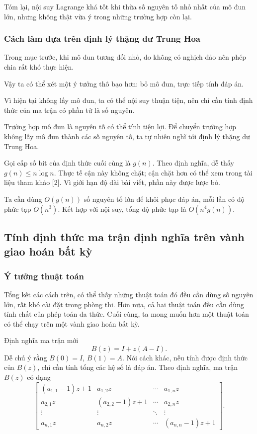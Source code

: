 \documentclass[11pt]{article}
\begin{document}
Tóm lại, nội suy Lagrange khá tốt khi thừa số nguyên tố nhỏ nhất của mô đun lớn,
nhưng không thật vừa ý trong những trường hợp còn lại.

\subsubsection{Cách làm dựa trên định lý thặng dư Trung Hoa}

Trong mục trước, khi mô đun tương đối nhỏ, do không có nghịch đảo nên phép chia
rất khó thực hiện.

Vậy ta có thể xét một ý tưởng thô bạo hơn: bỏ mô đun, trực tiếp tính đáp án.

Vì hiện tại không lấy mô đun, ta có thể nội suy thuận tiện, nên chỉ cần tính
định thức của ma trận có phần tử là số nguyên.

Trường hợp mô đun là nguyên tố có thể tính tiện lợi. Để chuyển trường hợp không
lấy mô đun thành các số nguyên tố, ta tự nhiên nghĩ tới định lý thặng dư Trung
Hoa.

Gọi cấp số bit của định thức cuối cùng là \(g(n)\). Theo định nghĩa, dễ thấy
\(g(n)\le n\log n\). Thực tế cận này không chặt; cận chặt hơn có thể xem trong
tài liệu tham khảo [2]. Vì giới hạn độ dài bài viết, phần này được lược bỏ.

Ta cần dùng \(O(g(n))\) số nguyên tố lớn để khôi phục đáp án, mỗi lần có độ phức
tạp \(O(n^3)\). Kết hợp với nội suy, tổng độ phức tạp là \(O(n^4g(n))\).

\subsection{Tính định thức ma trận định nghĩa trên vành giao hoán bất kỳ}

\subsubsection{Ý tưởng thuật toán}

Tổng kết các cách trên, có thể thấy những thuật toán đó đều cần dùng số nguyên
lớn, rất khó cài đặt trong phòng thi. Hơn nữa, cả hai thuật toán đều cần dùng
tính chất của phép toán đa thức. Cuối cùng, ta mong muốn hơn một thuật toán có
thể chạy trên một vành giao hoán bất kỳ.

Định nghĩa ma trận mới
\[
  B(z)=I+z(A-I).
\]
Dễ chú ý rằng \(B(0)=I\), \(B(1)=A\). Nói cách khác, nếu tính được định thức của
\(B(z)\), chỉ cần tính tổng các hệ số là đáp án. Theo định nghĩa, ma trận
\(B(z)\) có dạng
\[
  \begin{bmatrix}
  (a_{1,1}-1)z+1 & a_{1,2}z & \cdots & a_{1,n}z\\
  a_{2,1}z & (a_{2,2}-1)z+1 & \cdots & a_{2,n}z\\
  \vdots & \vdots & \ddots & \vdots\\
  a_{n,1}z & a_{n,2}z & \cdots & (a_{n,n}-1)z+1
  \end{bmatrix}.
\]
\end{document}
